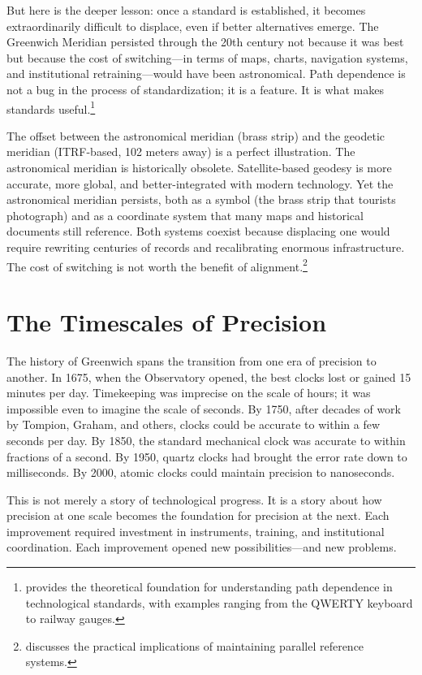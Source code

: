 But here is the deeper lesson: once a standard is established, it becomes extraordinarily difficult to displace, even if better alternatives emerge. The Greenwich Meridian persisted through the 20th century not because it was best but because the cost of switching---in terms of maps, charts, navigation systems, and institutional retraining---would have been astronomical. Path dependence is not a bug in the process of standardization; it is a feature. It is what makes standards useful.\footnote{\textcite{David1985} provides the theoretical foundation for understanding path dependence in technological standards, with examples ranging from the QWERTY keyboard to railway gauges.}

The offset between the astronomical meridian (brass strip) and the geodetic meridian (\textsc{ITRF}-based, 102 meters away) is a perfect illustration. The astronomical meridian is historically obsolete. Satellite-based geodesy is more accurate, more global, and better-integrated with modern technology. Yet the astronomical meridian persists, both as a symbol (the brass strip that tourists photograph) and as a coordinate system that many maps and historical documents still reference. Both systems coexist because displacing one would require rewriting centuries of records and recalibrating enormous infrastructure. The cost of switching is not worth the benefit of alignment.\footnote{\textcite{Levallois1986} discusses the practical implications of maintaining parallel reference systems.}

\section{The Timescales of Precision}

The history of Greenwich spans the transition from one era of precision to another. In 1675, when the Observatory opened, the best clocks lost or gained 15 minutes per day. Timekeeping was imprecise on the scale of hours; it was impossible even to imagine the scale of seconds. By 1750, after decades of work by Tompion, Graham, and others, clocks could be accurate to within a few seconds per day. By 1850, the standard mechanical clock was accurate to within fractions of a second. By 1950, quartz clocks had brought the error rate down to milliseconds. By 2000, atomic clocks could maintain precision to nanoseconds.

This is not merely a story of technological progress. It is a story about how precision at one scale becomes the foundation for precision at the next. Each improvement required investment in instruments, training, and institutional coordination. Each improvement opened new possibilities---and new problems.


